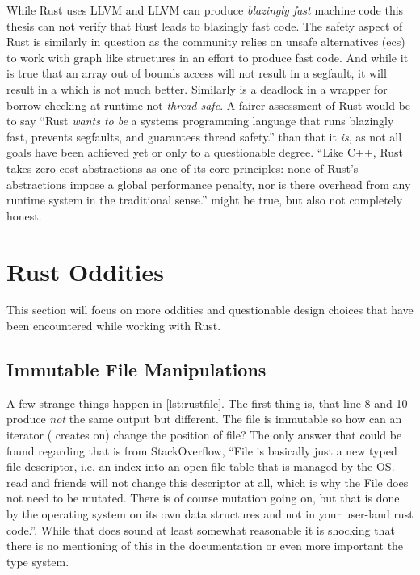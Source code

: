 \documentclass[thesis]{subfiles}
\begin{document}
  While Rust uses LLVM and LLVM can produce \emph{blazingly fast} machine code this thesis can not verify that Rust leads to blazingly fast code.
  The safety aspect of Rust is similarly in question as the community relies on unsafe alternatives (\gls{ecs}) to work with graph like structures in an effort to produce fast code.
  And while it is true that an array out of bounds access will not result in a segfault, it will result in a  which is not much better.
  Similarly is a deadlock in a wrapper for borrow checking at runtime not \emph{thread safe}.
  A fairer assessment of Rust would be to say \enquote{Rust \emph{wants to be} a systems programming language that runs blazingly fast, prevents segfaults, and guarantees thread safety.} than that it \emph{is}, as not all goals have been achieved yet or only to a questionable degree.
  \enquote{Like C++, Rust takes zero-cost abstractions as one of its core principles: none of Rust’s abstractions impose a global performance penalty, nor is there overhead from any runtime system in the traditional sense.}\autocite{rust-faq} might be true, but also not completely honest.

\section{Rust Oddities}
  This section will focus on more oddities and questionable design choices that have been encountered while working with Rust.

  \subsection{Immutable File Manipulations}
    A few strange things happen in \autoref{lst:rustfile}.
    The first thing is, that line 8 and 10 produce \emph{not} the same output but different.
    The file is immutable so how can an iterator ( creates on) change the position of file?
    The only answer that could be found regarding that is from StackOverflow, \enquote{File is basically just a new typed file descriptor, i.e. an index into an open-file table that is managed by the OS. read and friends will not change this descriptor at all, which is why the File does not need to be mutated. There is of course mutation going on, but that is done by the operating system on its own data structures and not in your user-land rust code.}\autocite{so-rust-file}.
    While that does sound at least somewhat reasonable it is shocking that there is no mentioning of this in the documentation or even more important the type system.
\end{document}
